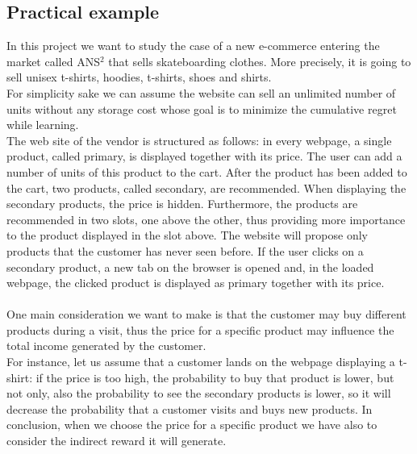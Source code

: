 \subsection*{Practical example}
In this project we want to study the case of a new e-commerce entering the market called ANS$^2$ that sells skateboarding clothes. More precisely, it is going to sell unisex t-shirts, hoodies, t-shirts, shoes and shirts.\\ For simplicity sake we can assume the website can sell an unlimited number of units without any storage cost whose goal is to minimize the cumulative regret while learning.\\
The web site of the vendor is structured as follows: in every webpage, a single product, called primary, is displayed together with its price. The user can add a number of units of this product to the cart. After the product has been added to the cart, two products, called secondary, are recommended. When displaying the secondary products, the price is hidden. Furthermore, the products are recommended in two slots, one above the other, thus providing more importance to the product displayed in the slot above. The website will propose only products that the customer has never seen before.
If the user clicks on a secondary product, a new tab on the browser is opened and, in the loaded webpage, the clicked product is displayed as primary together with its price.\\\\
One main consideration we want to make is that the customer may buy different products during a visit, thus the price for a specific product may influence the total income generated by the customer.\\ For instance, let us assume that a customer lands on the webpage displaying a t-shirt: if the price is too high, the probability to buy that product is lower, but not only, also the probability to see the secondary products is lower, so it will decrease the probability that a customer visits and buys new products. In conclusion, when we choose the price for a specific product we have also to consider the indirect reward it will generate.
